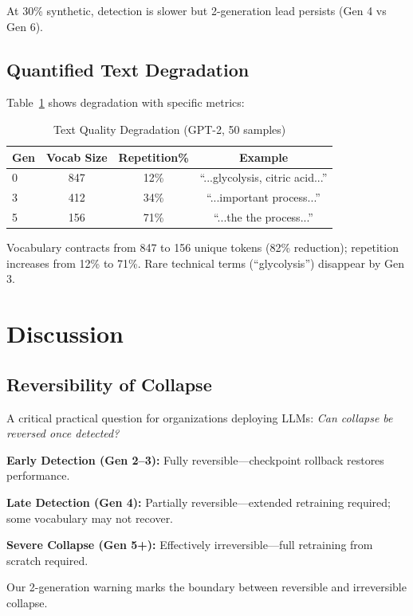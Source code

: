 \documentclass[conference]{IEEEtran}
\begin{document}
At 30\% synthetic, detection is slower but 2-generation lead persists (Gen 4 vs Gen 6).

\subsection{Quantified Text Degradation}

Table~\ref{tab:qualitative} shows degradation with specific metrics:

\begin{table}[!t]
\caption{Text Quality Degradation (GPT-2, 50 samples)}
\label{tab:qualitative}
\centering
\small
\begin{tabular}{@{}lccc@{}}
\toprule
\textbf{Gen} & \textbf{Vocab Size} & \textbf{Repetition\%} & \textbf{Example} \\
\midrule
0 & 847 & 12\% & ``...glycolysis, citric acid...'' \\
3 & 412 & 34\% & ``...important process...'' \\
5 & 156 & 71\% & ``...the the process...'' \\
\bottomrule
\end{tabular}
\end{table}

Vocabulary contracts from 847 to 156 unique tokens (82\% reduction); repetition increases from 12\% to 71\%. Rare technical terms (``glycolysis'') disappear by Gen 3.

\section{Discussion}

\subsection{Reversibility of Collapse}
\label{sec:reversibility}

A critical practical question for organizations deploying LLMs: \textit{Can collapse be reversed once detected?}

\textbf{Early Detection (Gen 2--3):} Fully reversible---checkpoint rollback restores performance.

\textbf{Late Detection (Gen 4):} Partially reversible---extended retraining required; some vocabulary may not recover.

\textbf{Severe Collapse (Gen 5+):} Effectively irreversible---full retraining from scratch required.

Our 2-generation warning marks the boundary between reversible and irreversible collapse.
\end{document}
